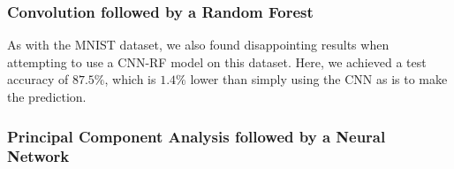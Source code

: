 \documentclass[onecolumn,10pt,cleanfoot]{asme2ej}
\begin{document}
\subsubsection{Convolution followed by a Random Forest}

As with the MNIST dataset, we also found disappointing results when attempting to use a CNN-RF model on this dataset. Here, we achieved a test accuracy of $87.5\%$, which is $1.4\%$ lower than simply using the CNN as is to make the prediction. 


\subsubsection{Principal Component Analysis followed by a Neural Network}

\end{document}
